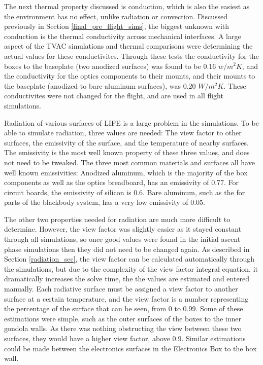 The next thermal property discussed is conduction, which is also the easiest as the environment has no effect, unlike radiation or convection. Discussed previously in Section \ref{final_pre_flight_sims}, the biggest unknown with conduction is the thermal conductivity across mechanical interfaces. A large aspect of the TVAC simulations and thermal comparisons were determining the actual values for these conductivites. Through these tests the conductivity for the boxes to the baseplate (two anodized surfaces) was found to be 0.16 $w/m^2K$, and the conductivity for the optics components to their mounts, and their mounts to the baseplate (anodized to bare aluminum surfaces), was 0.20 $W/m^2K$. These conductivites were not changed for the flight, and are used in all flight simulations.

Radiation of various surfaces of LIFE is a large problem in the simulations. To be able to simulate radiation, three values are needed: The view factor to other surfaces, the emissivity of the surface, and the temperature of nearby surfaces. The emissivity is the most well known property of these three values, and does not need to be tweaked. The three most common materials and surfaces all have well known emissivities: Anodized aluminum, which is the majority of the box components as well as the optics breadboard, has an emissivity of 0.77. For circuit boards, the emissivity of silicon is 0.6. Bare aluminum, such as the for parts of the blackbody system, has a very low emissivity of 0.05. 

The other two properties needed for radiation are much more difficult to determine. However, the view factor was slightly easier as it stayed constant through all simulations, so once good values were found in the initial ascent phase simulations then they did not need to be changed again. As described in Section \ref{radiation_sec}, the view factor can be calculated automatically through the simulations, but due to the complexity of the view factor integral equation, it dramatically increases the solve time, the the values are estimated and entered manually. Each radiative surface must be assigned a view factor to another surface at a certain temperature, and the view factor is a number representing the percentage of the surface that can be seen, from 0 to 0.99. Some of these estimations were simple, such as the outer surfaces of the boxes to the inner gondola walls. As there was nothing obstructing the view between these two surfaces, they would have a higher view factor, above 0.9. Similar estimations could be made between the electronics surfaces in the Electronics Box to the box wall.

